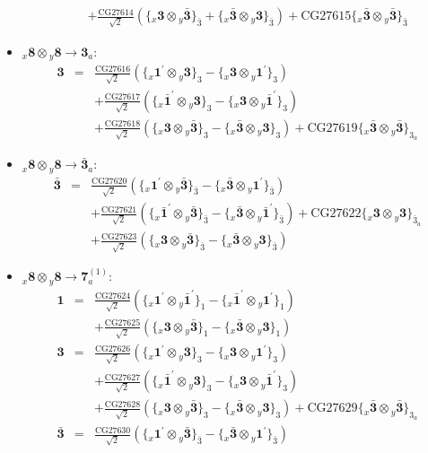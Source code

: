 \documentclass[english]{article}
\newcommand{\rep}[1]{\mathbf{#1}}
\newcommand{\repx}[2]{{}_{#2}\mathbf{#1}}
\newcommand{\subcg}[3]{\big\{ \repx{#1}{x}\otimes\repx{#2}{y}\big\}^{}_{#3}}
\begin{document}
\begin{itemize}
\begin{eqnarray*}
 & & +\frac{\text{CG27614}}{\sqrt{2}}\left(\subcg{3}{\bar{3}}{\bar{3}}+\subcg{\bar{3}}{3}{\bar{3}}\right)+\text{CG27615}\subcg{\bar{3}}{\bar{3}}{\bar{3}}
\end{eqnarray*}
\item $\repx{8}{x}\otimes\repx{8}{y}\to\rep{3}_{a}$:
\begin{eqnarray*}
\rep{3} &=& \frac{\text{CG27616}}{\sqrt{2}}\left(\subcg{1^{\prime}}{3}{3}-\subcg{3}{1^{\prime}}{3}\right) \\ 
 & & +\frac{\text{CG27617}}{\sqrt{2}}\left(\subcg{\bar{1}^{\prime}}{3}{3}-\subcg{3}{\bar{1}^{\prime}}{3}\right) \\ 
 & & +\frac{\text{CG27618}}{\sqrt{2}}\left(\subcg{3}{\bar{3}}{3}-\subcg{\bar{3}}{3}{3}\right)+\text{CG27619}\subcg{\bar{3}}{\bar{3}}{3_{a}}
\end{eqnarray*}
\item $\repx{8}{x}\otimes\repx{8}{y}\to\rep{\bar{3}}_{a}$:
\begin{eqnarray*}
\rep{\bar{3}} &=& \frac{\text{CG27620}}{\sqrt{2}}\left(\subcg{1^{\prime}}{\bar{3}}{\bar{3}}-\subcg{\bar{3}}{1^{\prime}}{\bar{3}}\right) \\ 
 & & +\frac{\text{CG27621}}{\sqrt{2}}\left(\subcg{\bar{1}^{\prime}}{\bar{3}}{\bar{3}}-\subcg{\bar{3}}{\bar{1}^{\prime}}{\bar{3}}\right)+\text{CG27622}\subcg{3}{3}{\bar{3}_{a}} \\ 
 & & +\frac{\text{CG27623}}{\sqrt{2}}\left(\subcg{3}{\bar{3}}{\bar{3}}-\subcg{\bar{3}}{3}{\bar{3}}\right)
\end{eqnarray*}
\item $\repx{8}{x}\otimes\repx{8}{y}\to\rep{7}_{a}^{(1)}$:
\begin{eqnarray*}
\rep{1} &=& \frac{\text{CG27624}}{\sqrt{2}}\left(\subcg{1^{\prime}}{\bar{1}^{\prime}}{1}-\subcg{\bar{1}^{\prime}}{1^{\prime}}{1}\right) \\ 
 & & +\frac{\text{CG27625}}{\sqrt{2}}\left(\subcg{3}{\bar{3}}{1}-\subcg{\bar{3}}{3}{1}\right)
\\
\rep{3} &=& \frac{\text{CG27626}}{\sqrt{2}}\left(\subcg{1^{\prime}}{3}{3}-\subcg{3}{1^{\prime}}{3}\right) \\ 
 & & +\frac{\text{CG27627}}{\sqrt{2}}\left(\subcg{\bar{1}^{\prime}}{3}{3}-\subcg{3}{\bar{1}^{\prime}}{3}\right) \\ 
 & & +\frac{\text{CG27628}}{\sqrt{2}}\left(\subcg{3}{\bar{3}}{3}-\subcg{\bar{3}}{3}{3}\right)+\text{CG27629}\subcg{\bar{3}}{\bar{3}}{3_{a}}
\\
\rep{\bar{3}} &=& \frac{\text{CG27630}}{\sqrt{2}}\left(\subcg{1^{\prime}}{\bar{3}}{\bar{3}}-\subcg{\bar{3}}{1^{\prime}}{\bar{3}}\right) \\ 

\end{eqnarray*}
\end{itemize}
\end{document}
